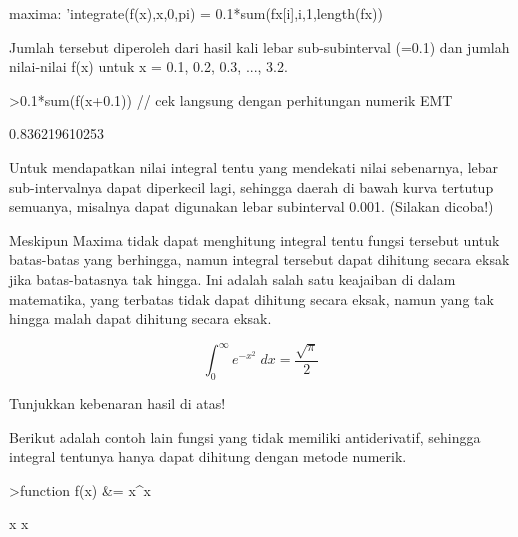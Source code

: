\documentclass[a4paper,10pt]{article}
\begin{document}
\begin{eulernotebook}
\begin{eulercomment}
\begin{eulercomment}
\begin{eulercomment}
\begin{eulercomment}
\begin{eulercomment}
\begin{eulercomment}
\begin{eulercomment}
\begin{eulercomment}
\begin{eulercomment}
maxima: 'integrate(f(x),x,0,pi) = 0.1*sum(fx[i],i,1,length(fx))


Jumlah tersebut diperoleh dari hasil kali lebar sub-subinterval (=0.1)
dan jumlah nilai-nilai f(x) untuk x = 0.1, 0.2, 0.3, ..., 3.2.
\end{eulercomment}
\begin{eulerprompt}
>0.1*sum(f(x+0.1)) // cek langsung dengan perhitungan numerik EMT
\end{eulerprompt}
\begin{euleroutput}
  0.836219610253
\end{euleroutput}
\begin{eulercomment}
Untuk mendapatkan nilai integral tentu yang mendekati nilai sebenarnya, lebar
sub-intervalnya dapat diperkecil lagi, sehingga daerah di bawah kurva tertutup
semuanya, misalnya dapat digunakan lebar subinterval 0.001. (Silakan dicoba!)

Meskipun Maxima tidak dapat menghitung integral tentu fungsi tersebut untuk
batas-batas yang berhingga, namun integral tersebut dapat dihitung secara eksak jika
batas-batasnya tak hingga. Ini adalah salah satu keajaiban di dalam matematika, yang
terbatas tidak dapat dihitung secara eksak, namun yang tak hingga malah dapat
dihitung secara eksak.
\end{eulercomment}
\begin{eulerformula}
\[
\int_{0}^{\infty }{e^ {- x^2 }\;dx}=\frac{\sqrt{\pi}}{2}
\]
\end{eulerformula}
\begin{eulercomment}
Tunjukkan kebenaran hasil di atas!

Berikut adalah contoh lain fungsi yang tidak memiliki antiderivatif, sehingga integral tentunya hanya
dapat dihitung dengan metode numerik.
\end{eulercomment}
\begin{eulerprompt}
>function f(x) &= x^x
\end{eulerprompt}
\begin{euleroutput}
  
                                     x
                                    x
  

\end{euleroutput}
\end{eulercomment}
\end{eulercomment}
\end{eulercomment}
\end{eulercomment}
\end{eulercomment}
\end{eulercomment}
\end{eulercomment}
\end{eulercomment}
\end{eulernotebook}
\end{document}

